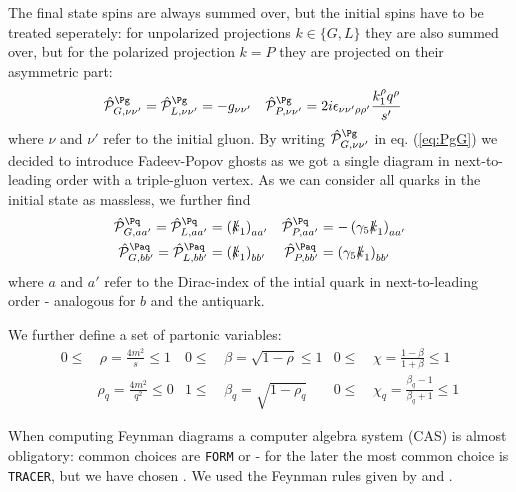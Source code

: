 The final state spins are always summed over, but the initial spins have to be treated seperately: for unpolarized projections $k\in\{G,L\}$ they are also summed over, but for the polarized projection $k=P$ they are projected on their asymmetric part:
\begin{align}
\hat {\mathcal P}^{\Pg}_{G,\nu\nu'} = \hat {\mathcal P}^{\Pg}_{L,\nu\nu'} &= -g_{\nu\nu'} &\hat {\mathcal P}^{\Pg}_{P,\nu\nu'} &= 2i\epsilon_{\nu\nu'\rho\rho'}\frac{k_1^{\rho}q^{\rho}}{s'}\label{eq:PgG}
\end{align}
where $\nu$ and $\nu'$ refer to the initial gluon. By writing $\hat {\mathcal P}^{\Pg}_{G,\nu\nu'}$ in eq. (\ref{eq:PgG}) we decided to introduce Fadeev-Popov ghosts\cite{Bojak:2000eu} as we got a single diagram in next-to-leading order with a triple-gluon vertex. As we can consider all quarks in the initial state as massless, we further find
\begin{align}
\hat {\mathcal P}^{\Pq}_{G,aa'} = \hat {\mathcal P}^{\Pq}_{L,aa'} &= \left(\slashed k_1\right)_{aa'}
&\hat {\mathcal P}^{\Pq}_{P,aa'} &= -\left(\gamma_5\slashed k_1\right)_{aa'}\\
\hat {\mathcal P}^{\Paq}_{G,bb'} = \hat {\mathcal P}^{\Paq}_{L,bb'} &= \left(\slashed k_1\right)_{bb'}
&\hat {\mathcal P}^{\Paq}_{P,bb'} &= \left(\gamma_5\slashed k_1\right)_{bb'}
\end{align}
where $a$ and $a'$ refer to the Dirac-index of the intial quark in next-to-leading order - analogous for $b$ and the antiquark.

We further define a set of partonic variables:
\begin{align}
0\leq&\,\rho = \frac {4m^2} s\leq 1 &0\leq&\,\beta = \sqrt{1-\rho}\leq 1 &0\leq&\,\chi = \frac{1-\beta}{1+\beta}\leq 1\\
&\rho_q = \frac {4m^2} {q^2}\leq 0 &1\leq&\,\beta_q = \sqrt{1-\rho_q} &0\leq&\,\chi_q = \frac{\beta_q-1}{\beta_q+1}\leq 1
\end{align}

When computing Feynman diagrams a computer algebra system (CAS) is almost obligatory: common choices are \texttt{FORM}\cite{Vermaseren:2000nd} or \MMa\cite{Mathematica} - for the later the most common choice is \texttt{TRACER}\cite{Tracer}, but we have chosen \HEPMath\cite{wiebusch_hepmath_2015}. We used the Feynman rules given by \cite{Leader} and \cite{Bojak:2000eu}.
